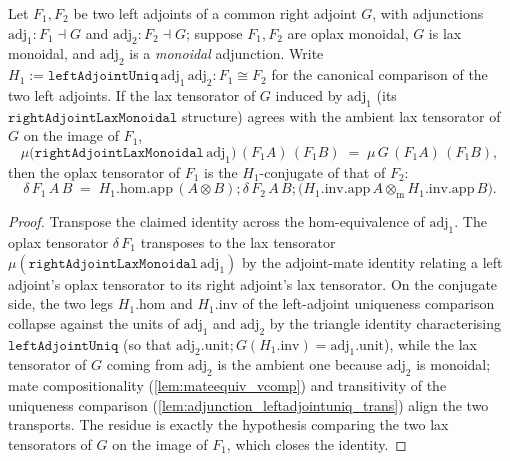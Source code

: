 \begin{lemma}
  \label{lem:deltaconjofmucomparison}
  Let \(F_1, F_2\) be two left adjoints of a common right adjoint \(G\), with adjunctions
  \(\mathrm{adj}_1 : F_1 \dashv G\) and \(\mathrm{adj}_2 : F_2 \dashv G\); suppose \(F_1, F_2\) are
  oplax monoidal, \(G\) is lax monoidal, and \(\mathrm{adj}_2\) is a \emph{monoidal} adjunction.
  Write \(H_1 := \mathtt{leftAdjointUniq}\,\mathrm{adj}_1\,\mathrm{adj}_2 : F_1 \cong F_2\) for the
  canonical comparison of the two left adjoints. If the lax tensorator of \(G\) induced by
  \(\mathrm{adj}_1\) (its \(\mathtt{rightAdjointLaxMonoidal}\) structure) agrees with the ambient
  lax tensorator of \(G\) on the image of \(F_1\),
  \[
    \mu\bigl(\mathtt{rightAdjointLaxMonoidal}\,\mathrm{adj}_1\bigr)\,(F_1 A)\,(F_1 B)
      \;=\; \mu\,G\,(F_1 A)\,(F_1 B),
  \]
  then the oplax tensorator of \(F_1\) is the \(H_1\)-conjugate of that of \(F_2\):
  \[
    \delta\,F_1\,A\,B
      \;=\; H_1.\mathrm{hom}.\mathrm{app}\,(A \otimes B)
        \mathbin{;} \delta\,F_2\,A\,B
        \mathbin{;} \bigl(H_1.\mathrm{inv}.\mathrm{app}\,A \otimes_{\mathrm m}
          H_1.\mathrm{inv}.\mathrm{app}\,B\bigr).
  \]
\end{lemma}
\begin{proof}
  \leanok
  Transpose the claimed identity across the hom-equivalence of \(\mathrm{adj}_1\). The oplax
  tensorator \(\delta\,F_1\) transposes to the lax tensorator
  \(\mu(\mathtt{rightAdjointLaxMonoidal}\,\mathrm{adj}_1)\) by the adjoint-mate identity relating a
  left adjoint's oplax tensorator to its right adjoint's lax tensorator. On the conjugate side, the
  two legs \(H_1.\mathrm{hom}\) and \(H_1.\mathrm{inv}\) of the left-adjoint uniqueness comparison
  collapse against the units of \(\mathrm{adj}_1\) and \(\mathrm{adj}_2\) by the triangle identity
  characterising \(\mathtt{leftAdjointUniq}\) (so that
  \(\mathrm{adj}_2.\mathrm{unit} \mathbin{;} G(H_1.\mathrm{inv}) = \mathrm{adj}_1.\mathrm{unit}\)),
  while the lax tensorator of \(G\) coming from \(\mathrm{adj}_2\) is the ambient one because
  \(\mathrm{adj}_2\) is monoidal; mate compositionality
  (\cref{lem:mateequiv_vcomp}) and transitivity of the uniqueness comparison
  (\cref{lem:adjunction_leftadjointuniq_trans}) align the two transports. The residue is exactly the
  hypothesis comparing the two lax tensorators of \(G\) on the image of \(F_1\), which closes the
  identity.
\end{proof}

